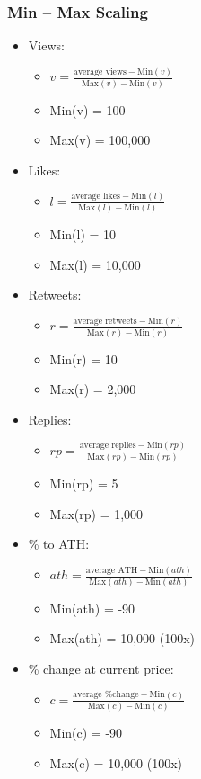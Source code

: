 \documentclass[11pt]{article}
\begin{document}
\subsubsection{Min – Max Scaling}
\label{sec:orgc3e1cce}
\begin{itemize}
\item Views:
\begin{itemize}
\item \(v = \frac{\text{average views} - \text{Min}(v)}{\text{Max}(v) - \text{Min}(v)}\)
\item Min(v) = 100
\item Max(v) = 100,000
\end{itemize}

\item Likes:
\begin{itemize}
\item \(l = \frac{\text{average likes} - \text{Min}(l)}{\text{Max}(l) - \text{Min}(l)}\)
\item Min(l) = 10
\item Max(l) = 10,000
\end{itemize}

\item Retweets:
\begin{itemize}
\item \(r = \frac{\text{average retweets} - \text{Min}(r)}{\text{Max}(r) - \text{Min}(r)}\)
\item Min(r) = 10
\item Max(r) = 2,000
\end{itemize}

\item Replies:
\begin{itemize}
\item \(rp = \frac{\text{average replies} - \text{Min}(rp)}{\text{Max}(rp) - \text{Min}(rp)}\)
\item Min(rp) = 5
\item Max(rp) = 1,000
\end{itemize}

\item \% to ATH:
\begin{itemize}
\item \(ath = \frac{\text{average ATH} - \text{Min}(ath)}{\text{Max}(ath) - \text{Min}(ath)}\)
\item Min(ath) = -90
\item Max(ath) = 10,000 (100x)
\end{itemize}

\item \% change at current price:
\begin{itemize}
\item \(c = \frac{\text{average \% change} - \text{Min}(c)}{\text{Max}(c) - \text{Min}(c)}\)
\item Min(c) = -90
\item Max(c) = 10,000 (100x)
\end{itemize}
\end{itemize}
\end{document}
